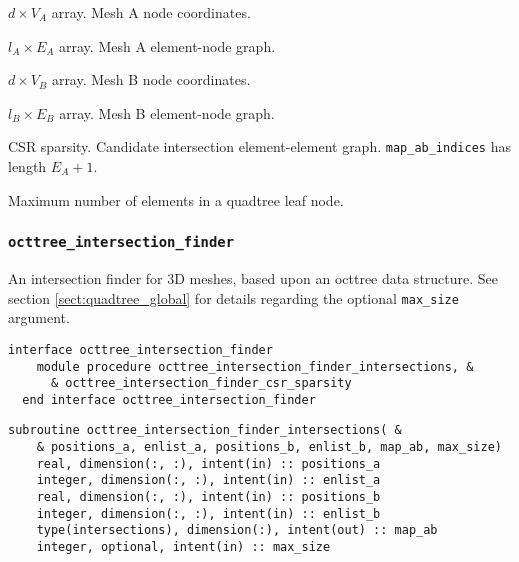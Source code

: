 \documentclass{article}
\begin{document}
\begin{description}[font=\ttfamily\bfseries,leftmargin=2.2\parindent,labelindent=1.7\parindent,noitemsep]
  \item[positions\_a] $d \times V_A$ array. Mesh A node coordinates.
  \item[enlist\_a] $l_A \times E_A$ array. Mesh A element-node graph.
  \item[positions\_b] $d \times V_B$ array. Mesh B node coordinates.
  \item[enlist\_b] $l_B \times E_B$ array. Mesh B element-node graph.
  \item[map\_ab\_indices, map\_ab\_indptr] CSR sparsity. Candidate intersection
    element-element graph. \linebreak \verb+map_ab_indices+ has length
    $E_A + 1$.
  \item[max\_size] Maximum number of elements in a quadtree leaf node.
\end{description}

\subsubsection{\texttt{octtree\_intersection\_finder}}\label{sect:octtree_global}

An intersection finder for 3D meshes, based upon an octtree data structure. See
section \ref{sect:quadtree_global} for details regarding the optional
\verb+max_size+ argument.

\begin{lstlisting}[language=FORTRAN]  
  interface octtree_intersection_finder
    module procedure octtree_intersection_finder_intersections, &
      & octtree_intersection_finder_csr_sparsity
  end interface octtree_intersection_finder
\end{lstlisting}

\begin{lstlisting}[language=FORTRAN]
  subroutine octtree_intersection_finder_intersections( &
    & positions_a, enlist_a, positions_b, enlist_b, map_ab, max_size)
    real, dimension(:, :), intent(in) :: positions_a
    integer, dimension(:, :), intent(in) :: enlist_a
    real, dimension(:, :), intent(in) :: positions_b
    integer, dimension(:, :), intent(in) :: enlist_b
    type(intersections), dimension(:), intent(out) :: map_ab
    integer, optional, intent(in) :: max_size
\end{lstlisting}
\end{document}
